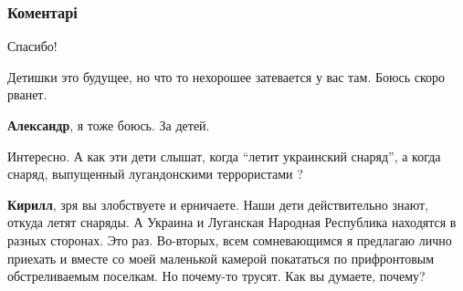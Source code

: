  
 
 
 
 
\subsubsection{Коментарі}

\begin{itemize} %

Спасибо!

Детишки это будущее, но что то нехорошее затевается у вас там. Боюсь скоро рванет.


\textbf{Александр}, я тоже боюсь. За детей.

Интересно. А как эти дети слышат, когда \enquote{летит украинский снаряд}, а когда
снаряд, выпущенный лугандонскими террористами ?

\textbf{Кирилл}, зря вы злобствуете и ерничаете. Наши дети действительно знают,
откуда летят снаряды. А Украина и Луганская Народная Республика находятся в
разных сторонах. Это раз. Во-вторых, всем сомневающимся я предлагаю лично
приехать и вместе со моей маленькой камерой покататься по прифронтовым
обстреливаемым поселкам. Но почему-то трусят. Как вы думаете, почему?

\end{itemize} %
